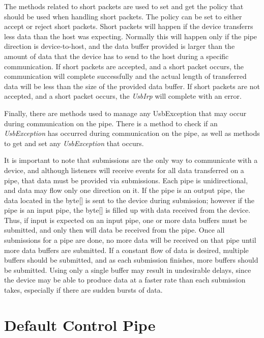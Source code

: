 \documentclass{article}
\newcommand{\myclass}[1]{\emph{#1}}
\newcommand{\myinterface}[1]{\emph{#1}}
\newcommand{\mysectionend}[0]{\vfill\pagebreak[1]}
\begin{document}
The methods related to short packets are used to set and get the policy that should be
used when handling short packets.  The policy can be set to either accept or reject
short packets.  Short packets will happen if the device transferrs less data than the
host was expecting.  Normally this will happen only if the pipe direction is
device-to-host, and the data buffer provided is larger than the amount of data that
the device has to send to the host during a specific communication.  If short packets
are accepted, and a short packet occurs, the communication will complete successfully
and the actual length of transferred data will be less than the size of the provided
data buffer.  If short packets are not accepted, and a short packet occurs, the
\myinterface{UsbIrp} will complete with an error.

Finally, there are methods used to manage any UsbException that may occur during
communication on the pipe.  There is a method to check if an \myclass{UsbException} has
occurred during communication on the pipe, as well as methods to get and set any
\myclass{UsbException} that occurs.

It is important to note that submissions are the only way to communicate
with a device, and although listeners will receive events for all data
transferred on a pipe, that data must be provided via submissions.
Each pipe is unidirectional, and data may flow only one direction on it.
If the pipe is an output pipe, the data located in the byte[] is sent
to the device during submission; however if the pipe is an input pipe,
the byte[] is filled up with data received from the device.  Thus,
if input is expected on an input pipe, one or more data buffers
must be submitted, and only then will data be received from the pipe.
Once all submissions for a pipe are done, no more data will be received on
that pipe until more data buffers are submitted.  If a constant flow
of data is desired, multiple buffers should be submitted, and as each
submission finishes, more buffers should be submitted.  Using only
a single buffer may result in undesirable delays, since the device
may be able to produce data at a faster rate than each submission takes,
especially if there are sudden bursts of data.

\mysectionend

\pagebreak

%

\section{Default Control Pipe}
\end{document}
